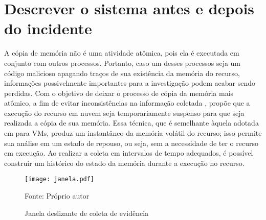 \section{Descrever o sistema antes e depois do incidente}
\label{sec:proposal-desc-incident}

A cópia de memória não é uma atividade atômica, pois ela é executada em conjunto com outros processos. 
%
Portanto, caso um desses processos seja um código malicioso apagando traços de sua existência da memória do recurso, informações possivelmente importantes para a investigação podem acabar sendo perdidas. 
%
Com o objetivo de deixar o processo de cópia da memória mais atômico, a fim de evitar inconsistências na informação coletada \cite{CaseMemoryForensics:2014}, \fancyname propõe que a execução do recurso em nuvem seja temporariamente suspenso para que seja realizada a cópia de sua memória. 
%
Essa técnica, que é semelhante àquela adotada em \cite{RafiqueStaticLiveDigitalForensics:2013} para VMs, produz um instantâneo da memória volátil do recurso; isso permite sua análise em um estado de repouso, ou seja, sem a necessidade de ter o recurso em execução.
%
Ao realizar a coleta em intervalos de tempo adequados, é possível construir um histórico do estado da memória durante a execução no recurso.
%

\begin{figure}[htb!]
\footnotesize
\caption{Janela deslizante de coleta de evidência}
\texttt{[image: janela.pdf]}
\centering
\label{fig:janela}
\begin{center}
Fonte: Próprio autor 
\end{center}
\end{figure}

